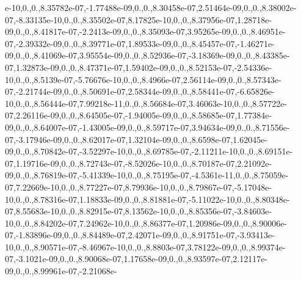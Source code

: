\begin{DoxyCompactItemize}
e-\/10,0.,0.,8.\-35782e-\/07,-\/1.\-77488e-\/09,0.,0.,8.\-30458e-\/07,2.\-51464e-\/09,0.,0.,8.\-38002e-\/07,-\/8.\-33135e-\/10,0.,0.,8.\-35502e-\/07,8.\-17825e-\/10,0.,0.,8.\-37956e-\/07,1.\-28718e-\/09,0.,0.,8.\-41817e-\/07,-\/2.\-2413e-\/09,0.,0.,8.\-35093e-\/07,3.\-95265e-\/09,0.,0.,8.\-46951e-\/07,-\/2.\-39332e-\/09,0.,0.,8.\-39771e-\/07,1.\-89533e-\/09,0.,0.,8.\-45457e-\/07,-\/1.\-46271e-\/09,0.,0.,8.\-41069e-\/07,3.\-95554e-\/09,0.,0.,8.\-52936e-\/07,-\/3.\-18369e-\/09,0.,0.,8.\-43385e-\/07,1.\-32873e-\/09,0.,0.,8.\-47371e-\/07,1.\-59402e-\/09,0.,0.,8.\-52153e-\/07,-\/2.\-54336e-\/10,0.,0.,8.\-5139e-\/07,-\/5.\-76676e-\/10,0.,0.,8.\-4966e-\/07,2.\-56114e-\/09,0.,0.,8.\-57343e-\/07,-\/2.\-21744e-\/09,0.,0.,8.\-50691e-\/07,2.\-58344e-\/09,0.,0.,8.\-58441e-\/07,-\/6.\-65826e-\/10,0.,0.,8.\-56444e-\/07,7.\-99218e-\/11,0.,0.,8.\-56684e-\/07,3.\-46063e-\/10,0.,0.,8.\-57722e-\/07,2.\-26116e-\/09,0.,0.,8.\-64505e-\/07,-\/1.\-94005e-\/09,0.,0.,8.\-58685e-\/07,1.\-77384e-\/09,0.,0.,8.\-64007e-\/07,-\/1.\-43005e-\/09,0.,0.,8.\-59717e-\/07,3.\-94634e-\/09,0.,0.,8.\-71556e-\/07,-\/3.\-17946e-\/09,0.,0.,8.\-62017e-\/07,1.\-32104e-\/09,0.,0.,8.\-6598e-\/07,1.\-62045e-\/09,0.,0.,8.\-70842e-\/07,-\/3.\-52297e-\/10,0.,0.,8.\-69785e-\/07,-\/2.\-11211e-\/10,0.,0.,8.\-69151e-\/07,1.\-19716e-\/09,0.,0.,8.\-72743e-\/07,-\/8.\-52026e-\/10,0.,0.,8.\-70187e-\/07,2.\-21092e-\/09,0.,0.,8.\-76819e-\/07,-\/5.\-41339e-\/10,0.,0.,8.\-75195e-\/07,-\/4.\-5361e-\/11,0.,0.,8.\-75059e-\/07,7.\-22669e-\/10,0.,0.,8.\-77227e-\/07,8.\-79936e-\/10,0.,0.,8.\-79867e-\/07,-\/5.\-17048e-\/10,0.,0.,8.\-78316e-\/07,1.\-18833e-\/09,0.,0.,8.\-81881e-\/07,-\/5.\-11022e-\/10,0.,0.,8.\-80348e-\/07,8.\-55683e-\/10,0.,0.,8.\-82915e-\/07,8.\-13562e-\/10,0.,0.,8.\-85356e-\/07,-\/3.\-84603e-\/10,0.,0.,8.\-84202e-\/07,7.\-24962e-\/10,0.,0.,8.\-86377e-\/07,1.\-20986e-\/09,0.,0.,8.\-90006e-\/07,-\/1.\-83896e-\/09,0.,0.,8.\-84489e-\/07,2.\-42071e-\/09,0.,0.,8.\-91751e-\/07,-\/3.\-93413e-\/10,0.,0.,8.\-90571e-\/07,-\/8.\-46967e-\/10,0.,0.,8.\-8803e-\/07,3.\-78122e-\/09,0.,0.,8.\-99374e-\/07,-\/3.\-1021e-\/09,0.,0.,8.\-90068e-\/07,1.\-17658e-\/09,0.,0.,8.\-93597e-\/07,2.\-12117e-\/09,0.,0.,8.\-99961e-\/07,-\/2.\-21068e-
\end{DoxyCompactItemize}
